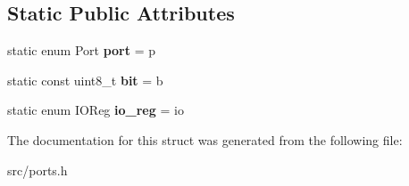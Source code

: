 \subsection*{Static Public Attributes}
\begin{DoxyCompactItemize}
\item 
static enum Port {\bfseries port} = p\hypertarget{struct__ports_1_1__Io_ac273a221d81c8d9490895c0b4f5184c6}{}\label{struct__ports_1_1__Io_ac273a221d81c8d9490895c0b4f5184c6}

\item 
static const uint8\+\_\+t {\bfseries bit} = b\hypertarget{struct__ports_1_1__Io_a3b3ec79adee20c3da63bc10635502892}{}\label{struct__ports_1_1__Io_a3b3ec79adee20c3da63bc10635502892}

\item 
static enum I\+O\+Reg {\bfseries io\+\_\+reg} = io\hypertarget{struct__ports_1_1__Io_abcaa0017938e949f81c8b20324f59fd7}{}\label{struct__ports_1_1__Io_abcaa0017938e949f81c8b20324f59fd7}

\end{DoxyCompactItemize}


The documentation for this struct was generated from the following file\+:\begin{DoxyCompactItemize}
\item 
src/ports.\+h\end{DoxyCompactItemize}
